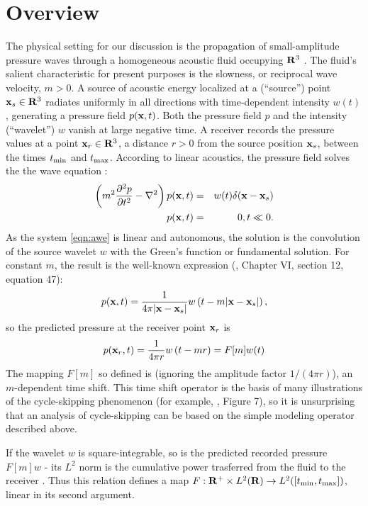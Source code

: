 \section{Overview}

The physical setting for our discussion is the propagation of
small-amplitude pressure waves through a
homogeneous acoustic fluid occupying ${\bf R}^3$ \cite[]{Frie:58}. The
fluid's salient characteristic for present purposes is the
slowness, or reciprocal wave velocity, $m > 0$. A source of acoustic
energy localized at a (``source'') point ${\bf x}_s \in {\bf R}^3$ radiates uniformly in all
directions with time-dependent intensity $w(t)$, generating a pressure
field $p({\bf x},t)$. Both the 
pressure field $p$ and the intensity (``wavelet'') $w$ vanish at large
negative time. A receiver records the pressure values at a point
${\bf x}_r \in {\bf R}^3$, a distance
$r>0$ from the source position ${\bf x}_s$, between the times $t_{\rm min}$ and
$t_{\rm max}$. According to linear acoustics, the pressure field
solves the the wave equation \cite[]{Frie:58}:
\begin{eqnarray}
  \label{eqn:awe}
  \left(m^2\frac{\partial^2 p}{\partial t^2} - \nabla^2\right) p({\bf x},t) &=&
                                                                         w(t)\delta({\bf x}-{\bf x}_s) \nonumber\\
  p({\bf x},t)&=&0, t\ll 0.
\end{eqnarray}
As the system \ref{eqn:awe} is linear and autonomous, the solution is
the convolution of the source
wavelet $w$ with the Green's function or fundamental solution. For
constant $m$, the result is the well-known expression
(\cite{CourHil:62}, Chapter VI, section 12, equation 47):
\begin{equation}
  \label{eqn:homsol}
  p({\bf x},t) = \frac{1}{4\pi |{\bf x}-{\bf x}_s|}w\left(t-m|{\bf x}-{\bf x}_s|\right),
\end{equation}
so the predicted pressure at the receiver point ${\bf x}_r$ is
\begin{equation}
\label{eqn:mod}
p({\bf x}_r,t) = \frac{1}{4\pi r}w\left(t-mr\right)  = F[m]w(t)
\end{equation}
The mapping $F[m]$ so defined is (ignoring the amplitude factor
$1/(4\pi r)$), an $m$-dependent time shift. This time shift operator is the basis of many illustrations of
the cycle-skipping phenomenon (for example, \cite{VirieuxOperto:09},
Figure 7), so it is unsurprising that an analysis of cycle-skipping
can be based on the simple modeling operator described above.

If the wavelet $w$ is square-integrable, so is the predicted
recorded pressure $F[m]w$ - its $L^2$ norm is the cumulative power trasferred
from the fluid to the receiver \cite[]{SantosaSymes:00}. Thus this relation defines a map
$F: {\bf R}^+ \times L^2({\bf R}) \rightarrow
L^2([t_{\rm min},t_{\rm max}])$, linear in its second argument.

